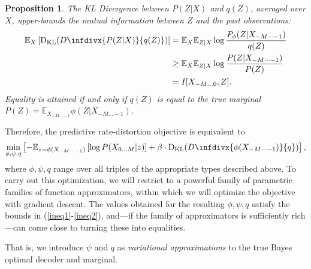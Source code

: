\documentclass[11pt,letterpaper]{article}
\newcommand{\E}[0]{\mathbb{E}}
\newif \ifcomment
\newcommand\rljf[1]{\ifcomment{{\color{blue}(#1)}}\else{}\fi}
\newcounter{theorem}
\newtheorem{proposition}[theorem]{Proposition}
\newcommand{\infdiv}{D\infdivx}
\begin{document}
\begin{proposition} 
The KL Divergence between $P(Z|X)$ and $q(Z)$, averaged over $X$, upper-bounds the mutual information between $Z$ and the past observations:
\begin{equation}\label{ineq2}
\begin{aligned}
	\mathbb{E}_{X}\left[ \operatorname{D_{KL}}(\infdiv{P(Z|X)}{q(Z)})\right] &=   \mathbb{E}_{X} \mathbb{E}_{Z|X} \log \frac{P_\phi(Z|X_{-M\dots -1})}{q(Z)}  \\
	& \geq  \mathbb{E}_{X} \mathbb{E}_{Z|X} \log \frac{P(Z|X_{-M\dots -1})}{P(Z)}  \\
	& = I[X_{-M\dots 0},Z].
\end{aligned}
\end{equation}
Equality is attained if and only if $q(Z)$ is equal to the true marginal $P(Z) = \E_{X_{-M \dots -1}} \phi(Z|X_{-M \dots -1})$.
\end{proposition}

Therefore, the predictive rate-distortion objective is equivalent to
\begin{equation}\label{eq:bound}
	\min_{\phi, \psi, q}	\left[-	\mathbb{E}_{z \sim \phi(X_{-M\dots-1})}\left[\log P(X_{0\dots M} | z)\right] + \beta \cdot \operatorname{D_{KL}}(\infdiv{\phi(X_{-M\dots-1})}{q})\right],
\end{equation}
where $\phi, \psi, q$ range over all triples of the appropriate types described above.
To carry out this optimization, we will restrict to a powerful family of parametric families of function approximators, within which we will optimize the objective with gradient descent.
The values obtained for the resulting $\phi, \psi, q$ satisfy the bounds in (\ref{ineq1}-\ref{ineq2}), and---if the family of approximators is sufficiently rich---can come close to turning these into equalities.

That is, we introduce $\psi$ and $q$ as \emph{variational approximations} \citep{blei-variational-2016} to the true Bayes optimal decoder and marginal. \rljf{Expand last sentence into a paragraph}


\end{document}
